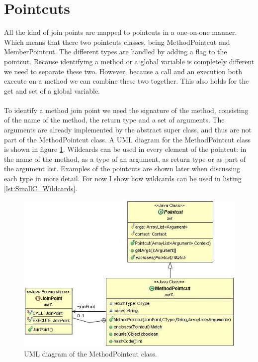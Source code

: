 \documentclass[a4paper]{report}
\begin{document}
\section{Pointcuts}
All the kind of join points are mapped to pointcuts in a one-on-one manner. Which means that there two pointcuts classes, being MethodPointcut and MemberPointcut. The different types are handled by adding a flag to the pointcut. Because identifying a method or a global variable is completely different we need to separate these two. However, because a call and an execution both execute on a method we can combine these two together. This also holds for the get and set of a global variable.\\
\\
To identify a method join point we need the signature of the method, consisting of the name of the method, the return type and a set of arguments. The arguments are already implemented by the abstract super class, and thus are not part of the MethodPointcut class. A UML diagram for the MethodPointcut class is shown in figure \ref{fig:MethodPointcut}. Wildcards can be used in every element of the pointcut: in the name of the method, as a type of an argument, as  return type or as part of the argument list. Examples of the pointcuts are shown later when discussing each type in more detail. For now I show how wildcards can be used in listing \ref{lst:SmallC_Wildcards}.\\
\begin{figure}[h!]
\centering
\includegraphics[scale=0.7]{images/AOFC/MethodPointcut.jpg}
\caption{UML diagram of the MethodPointcut class.}
\label{fig:MethodPointcut}
\end{figure}
\end{document}
